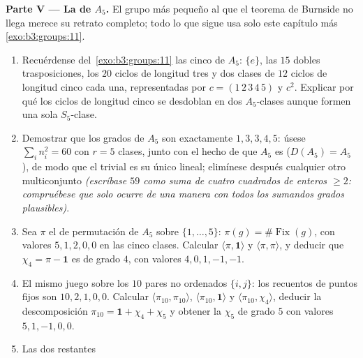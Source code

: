 \begin{problem}
\medskip
\noindent\textbf{Parte V --- La
 de $A_5$.} El
grupo más pequeño al que el teorema de Burnside no llega merece su
retrato completo; todo lo que sigue usa solo este capítulo más
\cref{exo:b3:groups:11}.
\begin{enumerate}[resume]
  \item Recuérdense del~\cref{exo:b3:groups:11} las cinco
   de $A_5$:
  $\{e\}$, las $15$ dobles trasposiciones, los $20$ ciclos de longitud
  tres y dos clases de $12$ ciclos de longitud cinco cada una,
  representadas por $c =
        (1\,2\,3\,4\,5)$ y $c^2$. Explicar por qué los ciclos de
  longitud cinco se desdoblan en dos $A_5$-clases aunque formen una sola
  $S_5$-clase. \item Demostrar que los grados
   de $A_5$ son
  exactamente $1, 3, 3, 4, 5$: úsese $\sum_in_i^2 = 60$ con $r = 5$
  clases, junto con el hecho de que $A_5$ es
   ($D(A_5) =
        A_5$), de modo que el
   trivial es su
  único  lineal; elimínese después cualquier otro multiconjunto
  \emph{(escríbase $59$ como suma de cuatro cuadrados de enteros
  $\geq 2$: compruébese que solo ocurre de una manera con todos los
  sumandos grados plausibles)}. \item Sea $\pi$ el
   de permutación de
  $A_5$ sobre
        $\{1, \dots, 5\}$: $\pi(g) = \#\operatorname{Fix}(g)$,
        con valores $5, 1, 2, 0, 0$ en las cinco clases. Calcular
        $\langle\pi, \mathbf 1\rangle$ y $\langle\pi,
        \pi\rangle$, y deducir que $\chi_4 = \pi - \mathbf 1$ es
         de grado $4$,
        con valores $4, 0, 1, -1,
        -1$. \item El mismo juego sobre los $10$ pares no ordenados
        $\{i, j\}$: los recuentos de puntos fijos son $10, 2, 1, 0, 0$.
        Calcular $\langle\pi_{10}, \pi_{10}\rangle$, $\langle\pi_{10},
        \mathbf 1\rangle$ y $\langle\pi_{10}, \chi_4\rangle$, deducir la
        descomposición $\pi_{10} = \mathbf 1 + \chi_4
        + \chi_5$ y obtener la
         $\chi_5$ de
        grado $5$ con valores $5, 1, -1, 0, 0$. \item Las dos
         restantes

\end{enumerate}
\end{problem}
